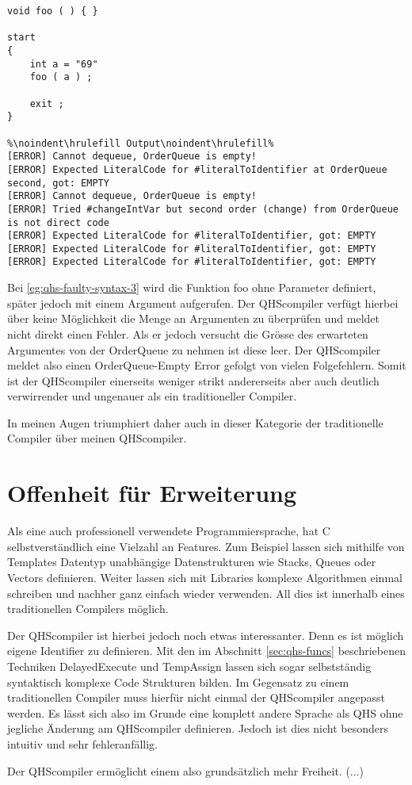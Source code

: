 \begin{lstlisting}[language=QHS, caption=QHS mit falscher Anzahl Argumente, label=eg:qhs-faulty-syntax-3]
void foo ( ) { }

start
{
    int a = "69" 
    foo ( a ) ;

    exit ;
}

%\noindent\hrulefill Output\noindent\hrulefill%
[ERROR] Cannot dequeue, OrderQueue is empty!
[ERROR] Expected LiteralCode for #literalToIdentifier at OrderQueue second, got: EMPTY
[ERROR] Cannot dequeue, OrderQueue is empty!
[ERROR] Tried #changeIntVar but second order (change) from OrderQueue is not direct code
[ERROR] Expected LiteralCode for #literalToIdentifier, got: EMPTY
[ERROR] Expected LiteralCode for #literalToIdentifier, got: EMPTY
[ERROR] Expected LiteralCode for #literalToIdentifier, got: EMPTY
\end{lstlisting}

Bei \ref{eg:qhs-faulty-syntax-3} wird die Funktion foo ohne Parameter definiert, später jedoch mit einem Argument aufgerufen. Der QHScompiler verfügt hierbei über keine Möglichkeit die Menge an Argumenten zu überprüfen
und meldet nicht direkt einen Fehler. Als er jedoch versucht die Grösse des erwarteten Argumentes von der OrderQueue zu nehmen ist diese leer.
Der QHScompiler meldet also einen OrderQueue-Empty Error gefolgt von vielen Folgefehlern.
Somit ist der QHScompiler einerseits weniger strikt andererseits aber auch deutlich verwirrender und ungenauer als ein traditioneller Compiler.

In meinen Augen triumphiert daher auch in dieser Kategorie der traditionelle Compiler über meinen QHScompiler.

\section{Offenheit für Erweiterung}
Als eine auch professionell verwendete Programmiersprache, hat C selbstverständlich eine Vielzahl an Features. Zum Beispiel lassen sich mithilfe von Templates Datentyp unabhängige Datenstrukturen wie Stacks, Queues oder Vectors definieren.
Weiter lassen sich mit Libraries komplexe Algorithmen einmal schreiben und nachher ganz einfach wieder verwenden. All dies ist innerhalb eines traditionellen Compilers möglich.

Der QHScompiler ist hierbei jedoch noch etwas interessanter. Denn es ist möglich eigene Identifier zu definieren. Mit den im Abschnitt \ref{sec:qhs-funcs} beschriebenen Techniken DelayedExecute und TempAssign
lassen sich sogar selbstständig syntaktisch komplexe Code Strukturen bilden. Im Gegensatz zu einem traditionellen Compiler muss hierfür nicht einmal der QHScompiler angepasst werden.
Es lässt sich also im Grunde eine komplett andere Sprache als QHS ohne jegliche Änderung am QHScompiler definieren. Jedoch ist dies nicht besonders intuitiv und sehr fehleranfällig.

Der QHScompiler ermöglicht einem also grundsätzlich mehr Freiheit. (...)